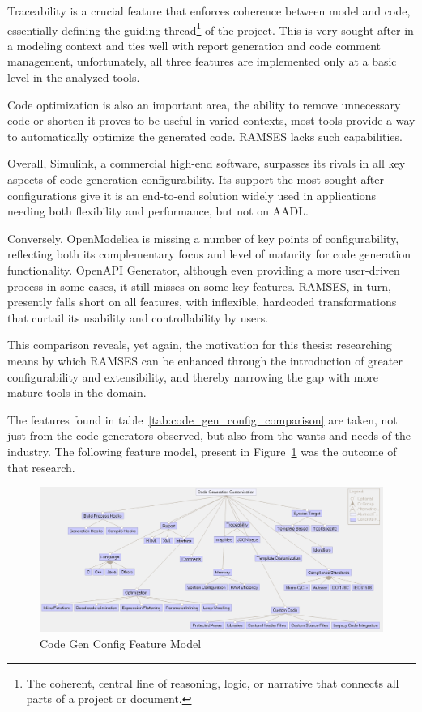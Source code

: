 Traceability is a crucial feature that enforces coherence between model and code, essentially defining the guiding thread\footnote{The coherent, central line of reasoning, logic, or narrative that connects all parts of a project or document.} of the project. This is very sought after in a modeling context and ties well with report generation and code comment management, unfortunately, all three features are implemented only at a basic level in the analyzed tools.

Code optimization is also an important area, the ability to remove unnecessary code or shorten it proves to be useful in varied contexts, most tools provide a way to automatically optimize the generated code. \gls{RAMSES} lacks such capabilities.

Overall, Simulink, a commercial high-end software, surpasses its rivals in all key aspects of code generation configurability. Its support the most sought after configurations give it is an end-to-end solution widely used in applications needing both flexibility and performance, but not on \gls{AADL}.

Conversely, OpenModelica is missing a number of key points of configurability, reflecting both its complementary focus and level of maturity for code generation functionality. OpenAPI Generator, although even providing a more user-driven process in some cases, it still misses on some key features. \gls{RAMSES}, in turn, presently falls short on all features, with inflexible, hardcoded transformations that curtail its usability and controllability by users.

This comparison reveals, yet again, the motivation for this thesis: researching means by which \gls{RAMSES} can be enhanced through the introduction of greater configurability and extensibility, and thereby narrowing the gap with more mature tools in the domain.

The features found in table~\ref{tab:code_gen_config_comparison} are taken, not just from the code generators observed, but also from the wants and needs of the industry. The following feature model, present in Figure~\ref{fig:feature_model} was the outcome of that research.

\begin{figure}[htbp]
	\centering
	\includegraphics[height=0.4\textwidth]{featureModel.png}
	\caption{Code Gen Config Feature Model}
	\label{fig:feature_model}
\end{figure}

